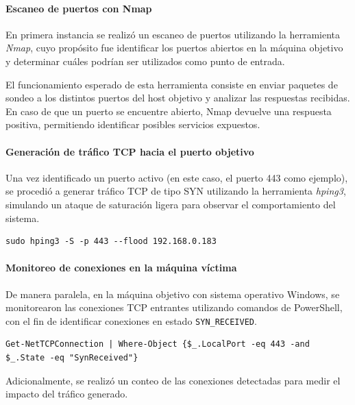 \paragraph{Escaneo de puertos con Nmap}

En primera instancia se realizó un escaneo de puertos utilizando la herramienta \textit{Nmap}, cuyo propósito fue identificar los puertos abiertos en la máquina objetivo y determinar cuáles podrían ser utilizados como punto de entrada.

El funcionamiento esperado de esta herramienta consiste en enviar paquetes de sondeo a los distintos puertos del host objetivo y analizar las respuestas recibidas. En caso de que un puerto se encuentre abierto, Nmap devuelve una respuesta positiva, permitiendo identificar posibles servicios expuestos.

\paragraph{Generación de tráfico TCP hacia el puerto objetivo}

Una vez identificado un puerto activo (en este caso, el puerto 443 como ejemplo), se procedió a generar tráfico TCP de tipo SYN utilizando la herramienta \textit{hping3}, simulando un ataque de saturación ligera para observar el comportamiento del sistema.

\begin{lstlisting}[caption={Generación de tráfico SYN hacia el puerto 443}]
sudo hping3 -S -p 443 --flood 192.168.0.183
\end{lstlisting}

\paragraph{Monitoreo de conexiones en la máquina víctima}

De manera paralela, en la máquina objetivo con sistema operativo Windows, se monitorearon las conexiones TCP entrantes utilizando comandos de PowerShell, con el fin de identificar conexiones en estado \texttt{SYN\_RECEIVED}.

\begin{lstlisting}[caption={Monitoreo de conexiones TCP en Windows}]
Get-NetTCPConnection | Where-Object {$_.LocalPort -eq 443 -and $_.State -eq "SynReceived"}
\end{lstlisting}

Adicionalmente, se realizó un conteo de las conexiones detectadas para medir el impacto del tráfico generado.

